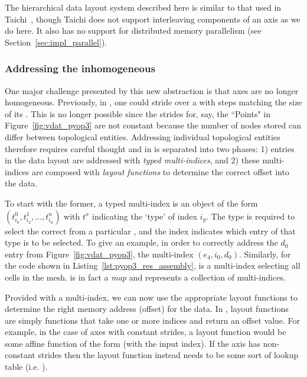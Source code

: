 The hierarchical data layout system described here is similar to that used in Taichi~\cite{huTaichiLanguageHighperformance2019}, though Taichi does not support interleaving components of an axis as we do here.
It also has no support for distributed memory parallelism (see Section~\ref{sec:impl_parallel}).

\subsubsection{Addressing the inhomogeneous}

One major challenge presented by this new abstraction is that axes are no longer homogeneous.
Previously, in , one could stride over a  with steps matching the size of its .
This is no longer possible since the strides for, say, the ``Points"  in Figure~\ref{fig:vdat_pyop3} are not constant because the number of nodes stored can differ between topological entities.
Addressing individual topological entities therefore requires careful thought and in  is separated into two phases:
1) entries in the data layout are addressed with \textit{typed multi-indices}, and
2) these multi-indices are composed with \textit{layout functions} to determine the correct offset into the data.

To start with the former, a typed multi-index is an object of the form $(t^0_{i_0}, t^1_{i_2}, \dots, t^n_{i_n})$ with $t^x$ indicating the `type' of index $i_y$.
The type is required to select the correct  from a particular , and the index indicates which entry of that type is to be selected.
To give an example, in order to correctly address the $d_0$ entry from Figure~\ref{fig:vdat_pyop3}, the multi-index $(e_4, i_0, d_0)$.
Similarly, for the code shown in Listing~\ref{lst:pyop3_res_assembly},  is a multi-index selecting all cells in the mesh.
 is in fact a \textit{map} and represents a collection of multi-indices.

Provided with a multi-index, we can now use the appropriate layout functions to determine the right memory address (offset) for the data.
In , layout functions are simply functions that take one or more indices and return an offset value. 
For example, in the case of axes with constant strides, a layout function would be some affine function of the form  (with  the input index).
If the axis has non-constant strides then the layout function instead needs to be some sort of lookup table (i.e. ).

